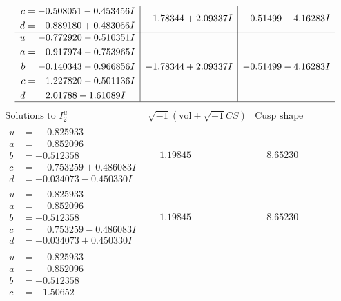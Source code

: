 \documentclass[1p]{elsarticle_modified}
\theoremstyle{definition}
\newcommand{\I}{\sqrt{-1}}
\begin{document}
$$\begin{array}{c|c|c}
\begin{aligned}
c &= -0.508051 - 0.453456 I \\
d &= -0.889180 + 0.483066 I\end{aligned}
 & -1.78344 + 2.09337 I & -0.51499 - 4.16283 I \\ \hline\begin{aligned}
u &= -0.772920 - 0.510351 I \\
a &= \phantom{-}0.917974 - 0.753965 I \\
b &= -0.140343 - 0.966856 I \\
c &= \phantom{-}1.227820 - 0.501136 I \\
d &= \phantom{-}2.01788 - 1.61089 I\end{aligned}
 & -1.78344 + 2.09337 I & -0.51499 - 4.16283 I\\
 \hline 
 \end{array}$$\newpage$$\begin{array}{c|c|c}  
\text{Solutions to }I^u_{2}& \I (\text{vol} + \sqrt{-1}CS) & \text{Cusp shape}\\
 \hline 
\begin{aligned}
u &= \phantom{-}0.825933\phantom{ +0.000000I} \\
a &= \phantom{-}0.852096\phantom{ +0.000000I} \\
b &= -0.512358\phantom{ +0.000000I} \\
c &= \phantom{-}0.753259 + 0.486083 I \\
d &= -0.034073 - 0.450330 I\end{aligned}
 & \phantom{-}1.19845\phantom{ +0.000000I} & \phantom{-}8.65230\phantom{ +0.000000I} \\ \hline\begin{aligned}
u &= \phantom{-}0.825933\phantom{ +0.000000I} \\
a &= \phantom{-}0.852096\phantom{ +0.000000I} \\
b &= -0.512358\phantom{ +0.000000I} \\
c &= \phantom{-}0.753259 - 0.486083 I \\
d &= -0.034073 + 0.450330 I\end{aligned}
 & \phantom{-}1.19845\phantom{ +0.000000I} & \phantom{-}8.65230\phantom{ +0.000000I} \\ \hline\begin{aligned}
u &= \phantom{-}0.825933\phantom{ +0.000000I} \\
a &= \phantom{-}0.852096\phantom{ +0.000000I} \\
b &= -0.512358\phantom{ +0.000000I} \\
c &= -1.50652\phantom{ +0.000000I} \\

\end{aligned}
\end{array}$$
\end{document}

